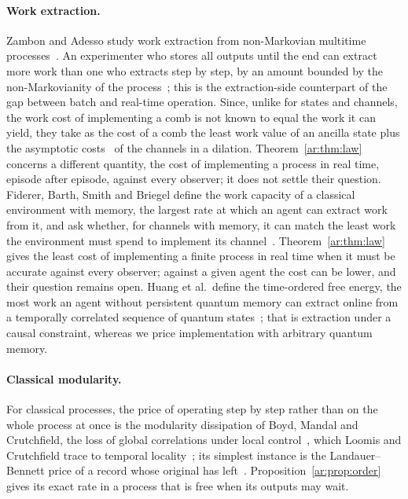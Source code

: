 \paragraph{Work extraction.} Zambon and Adesso study work extraction from non-Markovian multitime processes~\cite{ZambonAdesso}. An experimenter who stores all outputs until the end can extract more work than one who extracts step by step, by an amount bounded by the non-Markovianity of the process~\cite[Thm.~2]{ZambonAdesso}; this is the extraction-side counterpart of the gap between batch and real-time operation. Since, unlike for states and channels, the work cost of implementing a comb is not known to equal the work it can yield, they take as the cost of a comb the least work value of an ancilla state plus the asymptotic costs~\cite{FBB19,FBB21} of the channels in a dilation. Theorem~\ref{ar:thm:law} concerns a different quantity, the cost of implementing a process in real time, episode after episode, against every observer; it does not settle their question. Fiderer, Barth, Smith and Briegel define the work capacity of a classical environment with memory, the largest rate at which an agent can extract work from it, and ask whether, for channels with memory, it can match the least work the environment must spend to implement its channel~\cite{Fiderer26}. Theorem~\ref{ar:thm:law} gives the least cost of implementing a finite process in real time when it must be accurate against every observer; against a given agent the cost can be lower, and their question remains open. Huang et al.\ define the time-ordered free energy, the most work an agent without persistent quantum memory can extract online from a temporally correlated sequence of quantum states~\cite{HuangTOFE}; that is extraction under a causal constraint, whereas we price implementation with arbitrary quantum memory.

\paragraph{Classical modularity.} For classical processes, the price of operating step by step rather than on the whole process at once is the modularity dissipation of Boyd, Mandal and Crutchfield, the loss of global correlations under local control~\cite{BMC18}, which Loomis and Crutchfield trace to temporal locality~\cite{LoomisCrutchfield20}; its simplest instance is the Landauer--Bennett price of a record whose original has left~\cite{Bennett73,Bennett82}. Proposition~\ref{ar:prop:order} gives its exact rate in a process that is free when its outputs may wait.

